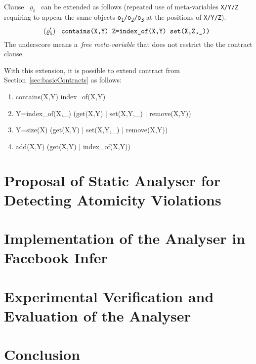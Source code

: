 Clause~$ \varrho_5 $~can be extended as follows (repeated use of
meta-variables \texttt{X/Y/Z} requiring to appear the same objects
\texttt{o\textsubscript{1}/o\textsubscript{2}/o\textsubscript{3}} at the
positions of \texttt{X/Y/Z}).
$$
    (\varrho^\prime_5)\ \text{\texttt{
        contains(X,Y) Z=index\_of(X,Y) set(X,Z,\_))
    }}
$$
The underscore means a~\emph{free meta-variable} that does not restrict
the the contract clause.

With this extension, it is possible to extend contract from
Section~\ref{sec:basicContracts} as follows:
\begin{enumerate}[label={$ (\varrho^\prime_{\arabic*}) $}]
    \tt

    \item contains(X,Y) index\_of(X,Y)
    \item Y=index\_of(X,\_) (get(X,Y) | set(X,Y,\_) | remove(X,Y))
    \item Y=size(X) (get(X,Y) | set(X,Y,\_) | remove(X,Y))
    \item add(X,Y) (get(X,Y) | index\_of(X,Y))
\end{enumerate}



\chapter{Proposal of Static Analyser for Detecting Atomicity Violations}
\label{chap:proposal}



\chapter{Implementation of the Analyser in Facebook Infer}
\label{chap:implementation}



\chapter{Experimental Verification and Evaluation of the Analyser}
\label{chap:experiments}



\chapter{Conclusion}
\label{chap:conclusion}


